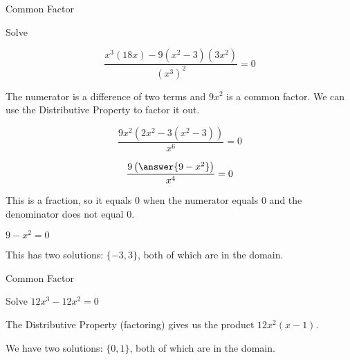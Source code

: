 \documentclass{ximera}
\begin{document}
\begin{example}  Common Factor


Solve 

\[  \frac{x^3 (18x) - 9(x^2-3)(3x^2)}{(x^3)^2} = 0 \]



\begin{explanation}


The numerator is a difference of two terms and $9 x^2$ is a common factor.  We can use the Distributive Property to factor it out.



\[  \frac{9x^2 (2x^2 - 3(x^2-3))}{x^6} = 0  \]


\[  \frac{9 \left( \answer{9 - x^2} \right)}{x^4} = 0 \]



This is a fraction, so it equals $0$ when the numerator equals $0$ and the denominator does not equal $0$.


$9 - x^2 = 0$

This has two solutions: $\{ -3, 3  \}$, both of which are in the domain.






\end{explanation}

\end{example}

















\begin{example}  Common Factor


Solve $12 x^3 - 12 x^2 = 0 $



\begin{explanation}


The Distributive Property (factoring) gives us the product $12 x^2 (x-1)$.




We have two solutions: $\{ 0, 1  \}$, both of which are in the domain.


\end{explanation}
\end{example}
\end{document}
